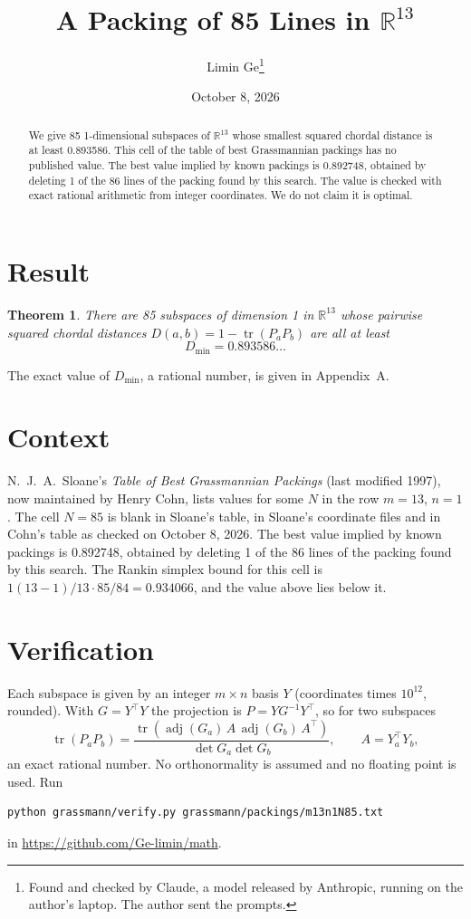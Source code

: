 \documentclass[11pt,a4paper]{article}
\title{A Packing of 85 Lines in $\mathbb{R}^{13}$}
\author{Limin Ge\thanks{Found and checked by Claude, a model released by Anthropic, running on the author's laptop. The author sent the prompts.}}
\date{October 8, 2026}
\newtheorem*{theorem}{Theorem}
\begin{document}
\maketitle
\begin{abstract}
We give 85 1-dimensional subspaces of $\mathbb{R}^{13}$ whose smallest squared chordal distance is at least 0.893586. This cell of the table of best Grassmannian packings has no published value. The best value implied by known packings is 0.892748, obtained by deleting 1 of the 86 lines of the packing found by this search. The value is checked with exact rational arithmetic from integer coordinates. We do not claim it is optimal.
\end{abstract}

\section{Result}
\begin{theorem}
There are 85 subspaces of dimension 1 in $\mathbb{R}^{13}$ whose pairwise squared chordal distances $D(a,b) = 1 - \operatorname{tr}(P_aP_b)$ are all at least
\[ D_{\min} = 0.893586\ldots \]
\end{theorem}
The exact value of $D_{\min}$, a rational number, is given in Appendix~A.


\section{Context}
N.~J.~A.~Sloane's \emph{Table of Best Grassmannian Packings} (last modified 1997), now maintained by Henry Cohn, lists values for some $N$ in the row $m=13$, $n=1$. The cell $N=85$ is blank in Sloane's table, in Sloane's coordinate files and in Cohn's table as checked on October 8, 2026. The best value implied by known packings is 0.892748, obtained by deleting 1 of the 86 lines of the packing found by this search. The Rankin simplex bound for this cell is $1(13-1)/13\cdot 85/84 = 0.934066$, and the value above lies below it.


\section{Verification}
Each subspace is given by an integer $m\times n$ basis $Y$ (coordinates times $10^{12}$, rounded). With $G=Y^\top Y$ the projection is $P=YG^{-1}Y^\top$, so for two subspaces
\[ \operatorname{tr}(P_aP_b)=\frac{\operatorname{tr}(\operatorname{adj}(G_a)\,A\,\operatorname{adj}(G_b)\,A^\top)}{\det G_a\det G_b},\qquad A=Y_a^\top Y_b, \]
an exact rational number. No orthonormality is assumed and no floating point is used. Run
\begin{verbatim}
python grassmann/verify.py grassmann/packings/m13n1N85.txt
\end{verbatim}
in \url{https://github.com/Ge-limin/math}.
\end{document}
